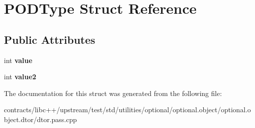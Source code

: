 \hypertarget{struct_p_o_d_type}{}\section{P\+O\+D\+Type Struct Reference}
\label{struct_p_o_d_type}
\subsection*{Public Attributes}
\begin{DoxyCompactItemize}
\item 
\mbox{\label{struct_p_o_d_type_a33681b2bfb3c3fe12c745aa3fe1aaca8}} 
int {\bfseries value}
\item 
\mbox{\label{struct_p_o_d_type_ae88aca230da5b26d35e22bbfbb6c79d6}} 
int {\bfseries value2}
\end{DoxyCompactItemize}


The documentation for this struct was generated from the following file\+:\begin{DoxyCompactItemize}
\item 
contracts/libc++/upstream/test/std/utilities/optional/optional.\+object/optional.\+object.\+dtor/dtor.\+pass.\+cpp\end{DoxyCompactItemize}

